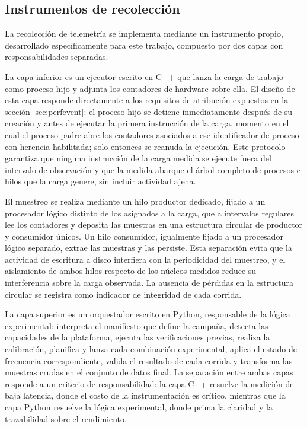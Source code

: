 \documentclass[12pt,oneside,spanish]{book}
\begin{document}
\subsection{Instrumentos de recolección}

La recolección de telemetría se implementa mediante un instrumento propio, desarrollado específicamente para este trabajo, compuesto por dos capas con responsabilidades separadas.

La capa inferior es un ejecutor escrito en C++ que lanza la carga de trabajo como proceso hijo y adjunta los contadores de hardware sobre ella. El diseño de esta capa responde directamente a los requisitos de atribución expuestos en la sección \ref{sec:perfevent}: el proceso hijo se detiene inmediatamente después de su creación y antes de ejecutar la primera instrucción de la carga, momento en el cual el proceso padre abre los contadores asociados a ese identificador de proceso con herencia habilitada; solo entonces se reanuda la ejecución. Este protocolo garantiza que ninguna instrucción de la carga medida se ejecute fuera del intervalo de observación y que la medida abarque el árbol completo de procesos e hilos que la carga genere, sin incluir actividad ajena.

El muestreo se realiza mediante un hilo productor dedicado, fijado a un procesador lógico distinto de los asignados a la carga, que a intervalos regulares lee los contadores y deposita las muestras en una estructura circular de productor y consumidor únicos. Un hilo consumidor, igualmente fijado a un procesador lógico separado, extrae las muestras y las persiste. Esta separación evita que la actividad de escritura a disco interfiera con la periodicidad del muestreo, y el aislamiento de ambos hilos respecto de los núcleos medidos reduce su interferencia sobre la carga observada. La ausencia de pérdidas en la estructura circular se registra como indicador de integridad de cada corrida.

La capa superior es un orquestador escrito en Python, responsable de la lógica experimental: interpreta el manifiesto que define la campaña, detecta las capacidades de la plataforma, ejecuta las verificaciones previas, realiza la calibración, planifica y lanza cada combinación experimental, aplica el estado de frecuencia correspondiente, valida el resultado de cada corrida y transforma las muestras crudas en el conjunto de datos final. La separación entre ambas capas responde a un criterio de responsabilidad: la capa C++ resuelve la medición de baja latencia, donde el costo de la instrumentación es crítico, mientras que la capa Python resuelve la lógica experimental, donde prima la claridad y la trazabilidad sobre el rendimiento.
\end{document}
